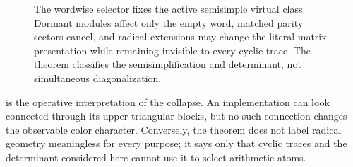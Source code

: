 \begin{figure}[t]
  \centering
  \resizebox{0.92\textwidth}{!}{}
  \caption{The wordwise selector fixes the active semisimple virtual class.
  Dormant modules affect only the empty word, matched parity sectors cancel,
  and radical extensions may change the literal matrix presentation while
  remaining invisible to every cyclic trace.  The theorem classifies the
  semisimplification and determinant, not simultaneous diagonalization.}
  \label{fig:visibility-layers}
\end{figure}

 is the operative interpretation of the collapse.
An implementation can look connected through its upper-triangular blocks,
but no such connection changes the observable color character.  Conversely,
the theorem does not label radical geometry meaningless for every purpose; it
says only that cyclic traces and the determinant considered here cannot use it
to select arithmetic atoms.
